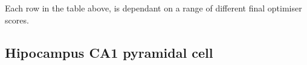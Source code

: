 Each row in the table above, is dependant on a range of different final optimiser scores. 
\begin{table}[ht]
\centering
{}
\caption[Observation, Prediction, Z-score]{Here we see: observation, prediction and Z-score on a model, by test basis. In otherwords if you break down each of the $\chi^{2}$ values in the table above, you can track down each value to these kinds of Z-score calculations}
\end{table} 




\subsection{Hipocampus CA1 pyramidal cell}


